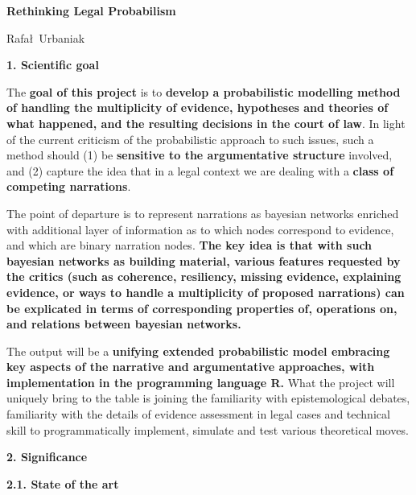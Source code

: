 \documentclass[11pt,dvipsnames,enabledeprecatedfontcommands]{scrartcl}
\author{}
\date{\vspace{-2.5em}}
\begin{document}
\begin{center}
\Large {\sc \textbf{Rethinking Legal Probabilism}}

\large Rafa\l\, Urbaniak
\end{center}

\vspace{2mm}

\thispagestyle{empty}

\noindent \Large \textbf{1. Scientific goal} \normalsize

\vspace{1mm}

The \textbf{goal of this project} is to
\textbf{develop  a probabilistic  modelling method of handling the multiplicity of evidence,  hypotheses and theories of what happened, and the resulting decisions in the court of law}.
In light of the current criticism of the probabilistic approach to such
issues, such a method should (1) be
\textbf{sensitive to the argumentative structure} involved, and (2)
capture the idea that in a legal context we are dealing with a
\textbf{class of competing narrations}.

The point of departure is to represent narrations as bayesian networks
enriched with additional layer of information as to which nodes
correspond to evidence, and which are binary narration nodes.
\textbf{The key idea is that with such bayesian networks as building material, various features requested by the critics (such as coherence, resiliency, missing evidence,  explaining evidence, or ways to handle a multiplicity of proposed narrations) can be explicated in terms of corresponding properties of,  operations on, and relations between bayesian networks.}

The output will be a
\textbf{unifying extended probabilistic model embracing key aspects of the narrative and argumentative approaches, with  implementation in the programming language \textbf{\textsf{R}}.}
What the project will uniquely bring to the table is joining the
familiarity with epistemological debates, familiarity with the details
of evidence assessment in legal cases and technical skill to
programmatically implement, simulate and test various theoretical moves.

\vspace{2mm}

\noindent \Large \textbf{2. Significance} \normalsize

\vspace{1mm}

\noindent \large \textbf{2.1. State of the art}
\end{document}
